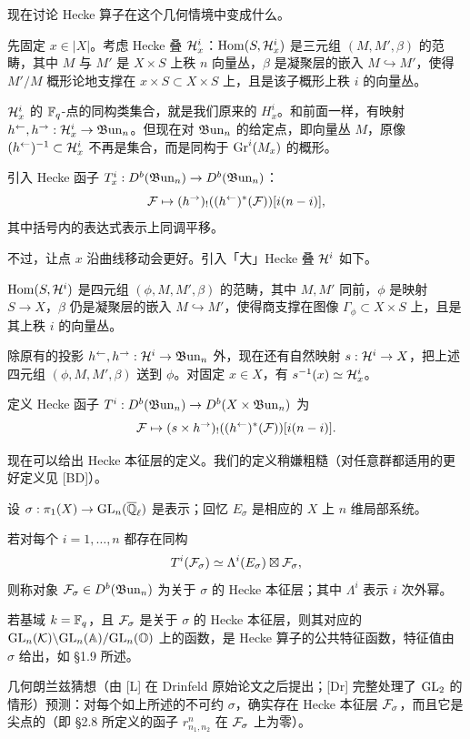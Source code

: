 现在讨论 Hecke 算子在这个几何情境中变成什么。

先固定 $x\in|X|$。考虑 Hecke 叠 $\mathcal{H}_x^i$：$\operatorname{Hom}(S,\mathcal{H}_x^i)$ 是三元组 $(M,M',\beta)$ 的范畴，其中 $M$ 与 $M'$ 是 $X\times S$ 上秩 $n$ 向量丛，$\beta$ 是凝聚层的嵌入 $M\hookrightarrow M'$，使得 $M'/M$ 概形论地支撑在 $x\times S\subset X\times S$ 上，且是该子概形上秩 $i$ 的向量丛。

$\mathcal{H}_x^i$ 的 $\mathbb{F}_q$-点的同构类集合，就是我们原来的 $H_x^i$。和前面一样，有映射 $h^{\leftarrow},h^{\rightarrow}:\mathcal{H}_x^i\to\mathfrak{B}\mathrm{un}_n$。但现在对 $\mathfrak{B}\mathrm{un}_n$ 的给定点，即向量丛 $M$，原像 $(h^{\leftarrow})^{-1}\subset\mathcal{H}_x^i$ 不再是集合，而是同构于 $\mathrm{Gr}^i(M_x)$ 的概形。

引入 Hecke 函子 $T_x^i:D^b(\mathfrak{B}\mathrm{un}_n)\to D^b(\mathfrak{B}\mathrm{un}_n)$：
\[
\mathcal{F}\mapsto(h^{\rightarrow})_!((h^{\leftarrow})^*(\mathcal{F}))[i(n-i)],
\]
其中括号内的表达式表示上同调平移。

不过，让点 $x$ 沿曲线移动会更好。引入「大」Hecke 叠 $\mathcal{H}^i$ 如下。

$\operatorname{Hom}(S,\mathcal{H}^i)$ 是四元组 $(\phi,M,M',\beta)$ 的范畴，其中 $M,M'$ 同前，$\phi$ 是映射 $S\to X$，$\beta$ 仍是凝聚层的嵌入 $M\hookrightarrow M'$，使得商支撑在图像 $\Gamma_\phi\subset X\times S$ 上，且是其上秩 $i$ 的向量丛。

除原有的投影 $h^{\leftarrow},h^{\rightarrow}:\mathcal{H}^i\to\mathfrak{B}\mathrm{un}_n$ 外，现在还有自然映射 $s:\mathcal{H}^i\to X$，把上述四元组 $(\phi,M,M',\beta)$ 送到 $\phi$。对固定 $x\in X$，有 $s^{-1}(x)\simeq\mathcal{H}_x^i$。

定义 Hecke 函子 $T^i:D^b(\mathfrak{B}\mathrm{un}_n)\to D^b(X\times\mathfrak{B}\mathrm{un}_n)$ 为
\[
\mathcal{F}\mapsto(s\times h^{\rightarrow})_!((h^{\leftarrow})^*(\mathcal{F}))[i(n-i)].
\]

现在可以给出 Hecke 本征层的定义。我们的定义稍嫌粗糙（对任意群都适用的更好定义见 [BD]）。

设 $\sigma:\pi_1(X)\to\mathrm{GL}_n(\overline{\mathbb{Q}}_\ell)$ 是表示；回忆 $E_\sigma$ 是相应的 $X$ 上 $n$ 维局部系统。

若对每个 $i=1,\dots,n$ 都存在同构
\[
T^i(\mathcal{F}_\sigma)\simeq\Lambda^i(E_\sigma)\boxtimes\mathcal{F}_\sigma,
\]
则称对象 $\mathcal{F}_\sigma\in D^b(\mathfrak{B}\mathrm{un}_n)$ 为关于 $\sigma$ 的 Hecke 本征层；其中 $\Lambda^i$ 表示 $i$ 次外幂。

若基域 $k=\mathbb{F}_q$，且 $\mathcal{F}_\sigma$ 是关于 $\sigma$ 的 Hecke 本征层，则其对应的 $\mathrm{GL}_n(\mathcal{K})\backslash\allowbreak\mathrm{GL}_n(\mathbb{A})/\mathrm{GL}_n(\mathbb{O})$ 上的函数，是 Hecke 算子的公共特征函数，特征值由 $\sigma$ 给出，如 \S1.9 所述。

几何朗兰兹猜想（由 [L] 在 Drinfeld 原始论文之后提出；[Dr] 完整处理了 $\mathrm{GL}_2$ 的情形）预测：对每个如上所述的不可约 $\sigma$，确实存在 Hecke 本征层 $\mathcal{F}_\sigma$，而且它是尖点的（即 \S2.8 所定义的函子 $r^n_{n_1,n_2}$ 在 $\mathcal{F}_\sigma$ 上为零）。

